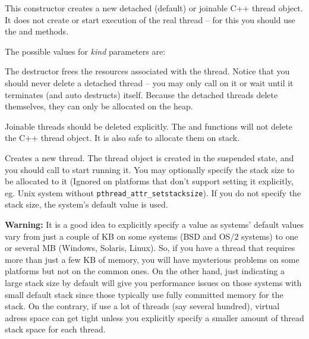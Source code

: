 \label{wxthreadctor}


This constructor creates a new detached (default) or joinable C++ thread object. It
does not create or start execution of the real thread -- for this you should
use the  and  methods.

The possible values for {\it kind} parameters are:

\twocolwidtha{7cm}
\begin{twocollist}\itemsep=0pt
\end{twocollist}


\label{wxthreaddtor}


The destructor frees the resources associated with the thread. Notice that you
should never delete a detached thread -- you may only call
 on it or wait until it terminates (and auto
destructs) itself. Because the detached threads delete themselves, they can
only be allocated on the heap.

Joinable threads should be deleted explicitly. The  and  functions
will not delete the C++ thread object. It is also safe to allocate them on
stack.


\label{wxthreadcreate}


Creates a new thread. The thread object is created in the suspended state, and you
should call  to start running it.  You may optionally
specify the stack size to be allocated to it (Ignored on platforms that don't
support setting it explicitly, eg. Unix system without
\texttt{pthread\_attr\_setstacksize}). If you do not specify the stack size,
the system's default value is used.

{\bf Warning:} It is a good idea to explicitly specify a value as systems'
default values vary from just a couple of KB on some systems (BSD and
OS/2 systems) to one or several MB (Windows, Solaris, Linux). So, if you
have a thread that requires more than just a few KB of memory, you will
have mysterious problems on some platforms but not on the common ones. On the
other hand, just indicating a large stack size by default will give you
performance issues on those systems with small default stack since those
typically use fully committed memory for the stack. On the contrary, if
use a lot of threads (say several hundred), virtual adress space can get tight
unless you explicitly specify a smaller amount of thread stack space for each
thread.


